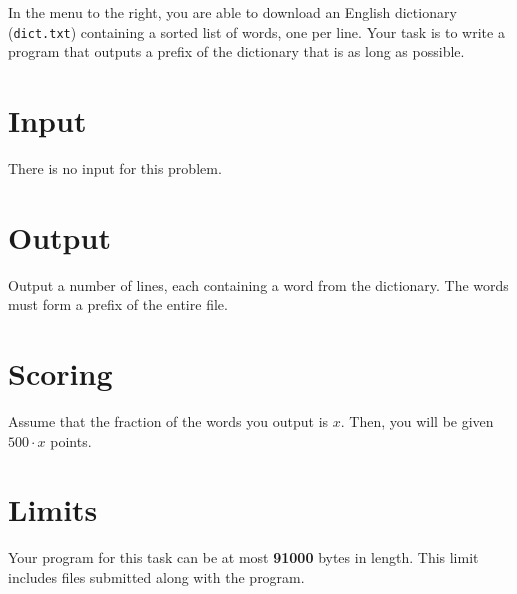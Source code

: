 In the menu to the right, you are able to download an English dictionary (\texttt{dict.txt}) containing a sorted list of words, one per line.
Your task is to write a program that outputs a prefix of the dictionary that is as long as possible.

\section*{Input}
There is no input for this problem.

\section*{Output}
Output a number of lines, each containing a word from the dictionary.
The words must form a prefix of the entire file.

\section*{Scoring}
Assume that the fraction of the words you output is $x$. Then, you will be given $500 \cdot x$ points.

\section*{Limits}
Your program for this task can be at most \textbf{91000} bytes in length.
This limit includes files submitted along with the program.
